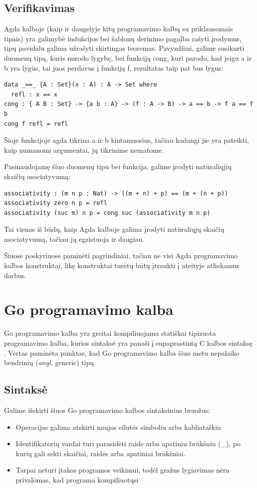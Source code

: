 \documentclass{VUMIFPSkursinis}
\begin{document}
\subsection{Verifikavimas}
Agda kalboje (kaip ir daugelyje kitų programavimo kalbų su priklausomais tipais) yra galimybė indukcijos bei šablonų derinimo pagalba rašyti įrodymus, tipų pavidalu galima užrašyti skirtingas teoremas. Pavyzdžiui, galime susikurti duomenų tipą, kuris nurodo lygybę, bei funkciją cong, kuri parodo, kad jeigu a ir b yra lygūs, tai juos perdavus į funkciją f, rezultatas taip pat bus lygus:
\begin{lstlisting}
data _==_ {A : Set}(x : A) : A -> Set where
  refl : x == x
cong : { A B : Set} -> {a b : A} -> (f : A -> B) -> a == b -> f a == f b
cong f refl = refl
	\end{lstlisting}
Šioje funkcijoje agda tikrina a ir b kintamuosius, tačiau kadangi jie yra pateikti, kaip numanomi argumentai, jų tikrinime nematome.\par Pasinaudojamę šiuo duomenų tipu bei funkcija, galime įrodyti natūraliųjių skaičių asociatyvumą:
\begin{lstlisting}
associativity : (m n p : Nat) -> ((m + n) + p) == (m + (n + p))
associativity zero n p = refl
associativity (suc m) n p = cong suc (associativity m n p)
\end{lstlisting}
Tai vienas iš būdų, kaip Agda kalboje galima įrodyti natūraliųjų skaičių asociatyvumą, tačiau jų egzistuoja ir daugiau.
\par Šiuose poskyriuose paminėti pagrindiniai, tačiau ne visi Agda programavimo kalbos konstruktai, likę konstruktai turėtų būtų įtraukti į ateityje atliekamus darbus.
\section{Go programavimo kalba}
Go programavimo kalba yra greitai kompiliuojama statiškai tipizuota programavimo kalba, kurios sintaksė yra panaši į supaprastintą C kalbos sintaksę \cite{Go}. Vertas paminėta punktas, kad Go programavimo kalba šiuo metu nepalaiko bendrinių (\textit{angl.} generic) tipų.
\subsection{Sintaksė}
Galime išskirti šiuos Go programavimo kalbos sintaksinius bruožus:
\begin{itemize}
	\item Operacijas galima atskirti naujos eilutės simboliu arba kabliataškiu
	\item Identifikatorių vardai turi parasidėti raide arba apatiniu brūkšniu (\_), po kurių gali sekti skaičiai, raidės arba apatiniai brūkšniai.
	\item Tarpai neturi įtakos programos veikimui, todėl gražus lygiavimas nėra privalomas, kad programa kompiliuotųsi
\end{itemize}
\end{document}
